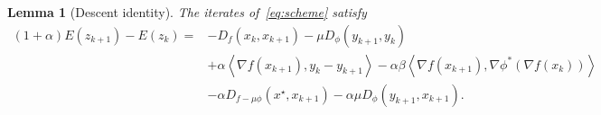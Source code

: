 \documentclass{article}
\newcommand{\dual}[1]{\left\langle {#1} \right\rangle}
\theoremstyle{plain}
\newtheorem{lemma}[theorem]{Lemma}
\theoremstyle{definition}
\theoremstyle{remark}
\begin{document}
\begin{lemma}[Descent identity]\label{lem:descentidentity}
The iterates of~\eqref{eq:scheme} satisfy
\begin{equation}\label{eq:descent}
\begin{split}
(1+\alpha)E(z_{k+1})-E(z_k)
={}&-D_f(x_k,x_{k+1})-\mu D_\phi(y_{k+1},y_k)\\
&+\alpha\dual{\nabla f(x_{k+1}),y_k-y_{k+1}}
-\alpha\beta\dual{\nabla f(x_{k+1}),\nabla\phi^*(\nabla f(x_k))}\\
&-\alpha D_{f-\mu\phi}(x^\star,x_{k+1})
-\alpha\mu D_\phi(y_{k+1},x_{k+1}).
\end{split}
\end{equation}
\end{lemma}
%
\end{document}
